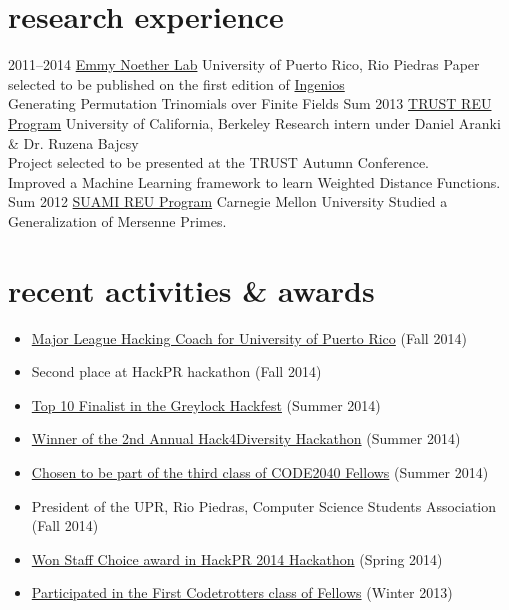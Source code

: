 \documentclass[]{friggeri-cv}
\begin{document}
\section{research experience}

\begin{entrylist}
\entry
{2011--2014}
{\href{http://ccom.uprrp.edu/~labemmy/?page_id=868}{Emmy Noether Lab}}
{University of Puerto Rico, Rio Piedras}
{Paper selected to be published on the first edition of \href{http://www.ingeniosupr.com/}{Ingenios} \\
Generating Permutation Trinomials over Finite Fields}
\entry
{Sum 2013}
{\href{https://www.truststc.org/education/reu/13/index.html}{TRUST REU Program}}
{University of California, Berkeley}
{Research intern under Daniel Aranki \& Dr. Ruzena Bajcsy \\
Project selected to be presented at the TRUST Autumn Conference. \\
Improved a Machine Learning framework to learn Weighted Distance Functions.}
\entry
{Sum 2012}
{\href{http://www.math.cmu.edu/cna/summer_institute.html}{SUAMI REU Program}}
{Carnegie Mellon University}
{Studied a Generalization of Mersenne Primes.}
\end{entrylist}


\section{recent activities \& awards}
\begin{itemize}
\item \href{http://mlh.io}{Major League Hacking Coach for University of Puerto Rico} (Fall 2014)
\item Second place at HackPR hackathon (Fall 2014)
\item \href{http://greylocku.com/hackfest/}{Top 10 Finalist in the Greylock Hackfest} (Summer 2014)
\item \href{https://www.eventbrite.com/e/2nd-annual-hack4diversity-closing-the-gap-tickets-11888106647}{Winner of the 2nd Annual Hack4Diversity Hackathon} (Summer 2014)
\item \href{http://code2040.org}{Chosen to be part of the third class of CODE2040 Fellows} (Summer 2014)
\item President of the UPR, Rio Piedras, Computer Science Students Association (Fall 2014)
\item \href{https://github.com/chrisrodz/gh-backups}{Won Staff Choice award in HackPR 2014 Hackathon} (Spring 2014)
\item \href{http://codetrotters.com}{Participated in the First Codetrotters class of Fellows} (Winter 2013)
\end{itemize}
\end{document}
